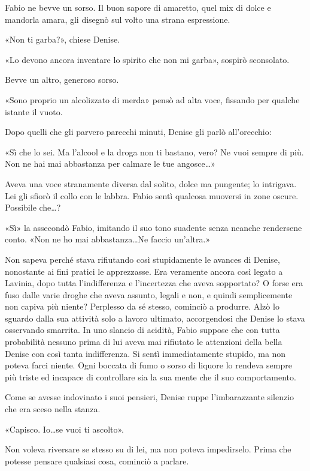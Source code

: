 Fabio ne bevve un sorso. Il buon sapore di amaretto, quel mix di dolce e mandorla amara, gli disegnò sul volto una strana espressione.

«Non ti garba?», chiese Denise.

«Lo devono ancora inventare lo spirito che non mi garba», sospirò sconsolato.

Bevve un altro, generoso sorso.

«Sono proprio un alcolizzato di merda» pensò ad alta voce, fissando per qualche istante il vuoto.

Dopo quelli che gli parvero parecchi minuti, Denise gli parlò all'orecchio:

«Sì che lo sei. Ma l'alcool e la droga non ti bastano, vero? Ne vuoi sempre di più. Non ne hai mai abbastanza per calmare le tue angosce\ldots»

Aveva una voce stranamente diversa dal solito, dolce ma pungente; lo intrigava. Lei gli sfiorò il collo con le labbra. Fabio sentì qualcosa muoversi in zone oscure. Possibile che\ldots?

«Sì» la assecondò Fabio, imitando il suo tono suadente senza neanche rendersene conto. «Non ne ho mai abbastanza\ldots Ne faccio un'altra.»

Non sapeva perché stava rifiutando così stupidamente le avances di Denise, nonostante ai fini pratici le apprezzasse. Era veramente ancora così legato a Lavinia, dopo tutta l'indifferenza e l'incertezza che aveva sopportato? O forse era fuso dalle varie droghe che aveva assunto, legali e non, e quindi semplicemente non capiva più niente? Perplesso da sé stesso, cominciò a produrre. Alzò lo sguardo dalla sua attività solo a lavoro ultimato, accorgendosi che Denise lo stava osservando smarrita. In uno slancio di acidità, Fabio suppose che con tutta probabilità nessuno prima di lui aveva mai rifiutato le attenzioni della bella Denise con così tanta indifferenza. Si sentì immediatamente stupido, ma non poteva farci niente. Ogni boccata di fumo o sorso di liquore lo rendeva sempre più triste ed incapace di controllare sia la sua mente che il suo comportamento.

Come se avesse indovinato i suoi pensieri, Denise ruppe l'imbarazzante silenzio che era sceso nella stanza.

«Capisco. Io\ldots se vuoi ti ascolto».

Non voleva riversare se stesso su di lei, ma non poteva impedirselo. Prima che potesse pensare qualsiasi cosa, cominciò a parlare.

